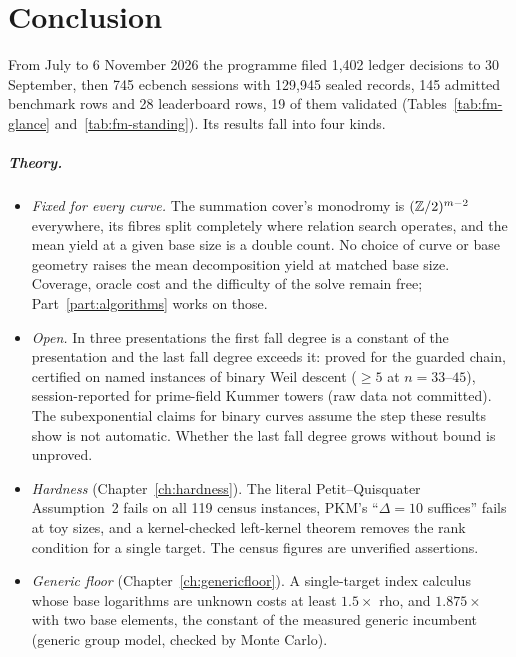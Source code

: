\chapter{Conclusion}\label{ch:conclusion}

From July to 6 November 2026 the programme filed 1{,}402 ledger decisions
to 30 September, then 745 ecbench sessions with 129{,}945 sealed records,
145 admitted benchmark rows and 28 leaderboard rows, 19 of them validated
(Tables~\ref{tab:fm-glance} and~\ref{tab:fm-standing}). Its results fall
into four kinds.

\paragraph{Theory.}
\begin{itemize}
\item \emph{Fixed for every curve.} The summation cover's monodromy is
  $(\mathbb{Z}/2)^{m-2}$ everywhere, its fibres split completely where relation
  search operates, and the mean yield at a given base size is a double
  count. No choice of curve or base geometry raises the mean decomposition
  yield at matched base size. Coverage, oracle cost and the difficulty of
  the solve remain free; Part~\ref{part:algorithms} works on those.
\item \emph{Open.} In three presentations the first fall degree is a
  constant of the presentation and the last fall degree exceeds it: proved
  for the guarded chain, certified on named instances of binary Weil
  descent ($\ge5$ at $n=33$--$45$), session-reported for prime-field
  Kummer towers (raw data not committed). The subexponential claims for
  binary curves assume the step these results show is not automatic.
  Whether the last fall degree grows without bound is unproved.
\item \emph{Hardness} (Chapter~\ref{ch:hardness}). The literal
  Petit--Quisquater Assumption~2 fails on all 119 census instances, PKM's
  ``$\Delta=10$ suffices'' fails at toy sizes, and a kernel-checked
  left-kernel theorem removes the rank condition for a single target. The
  census figures are unverified assertions.
\item \emph{Generic floor} (Chapter~\ref{ch:genericfloor}). A
  single-target index calculus whose base logarithms are unknown costs at
  least $1.5\times$ rho, and $1.875\times$ with two base elements, the
  constant of the measured generic incumbent (generic group model, checked
  by Monte Carlo).
\end{itemize}

